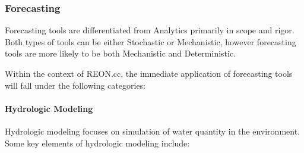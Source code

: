 \documentclass[letterpaper,12pt,english]{book}
\begin{document}
\subsubsection{Forecasting}
\label{\detokenize{requirements/knowledge/forecasting:forecasting}}\label{\detokenize{requirements/knowledge/forecasting::doc}}
\sphinxAtStartPar
Forecasting tools are differentiated from Analytics primarily in scope and
rigor. Both types of tools can be either Stochastic or Mechanistic, however
forecasting tools are more likely to be both Mechanistic and Deterministic.

\sphinxAtStartPar
Within the context of REON.cc, the immediate application of forecasting tools will fall under the following categories:


\paragraph{Hydrologic Modeling}
\label{\detokenize{requirements/knowledge/hydrologic:hydrologic-modeling}}\label{\detokenize{requirements/knowledge/hydrologic::doc}}
\sphinxAtStartPar
Hydrologic modeling focuses on simulation of water quantity in the environment. Some key elements of hydrologic modeling include:
\end{document}
